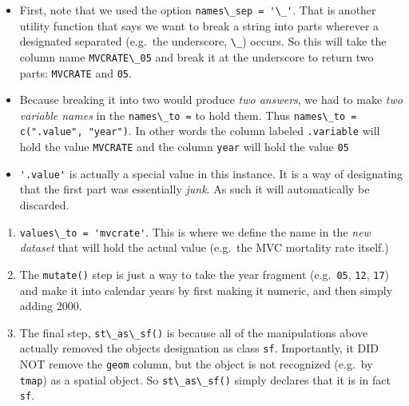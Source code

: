 \documentclass[
]{book}
\newcommand{\passthrough}[1]{#1}
\providecommand{\tightlist}{%
  \setlength{\itemsep}{0pt}\setlength{\parskip}{0pt}}
\begin{document}
\begin{itemize}
\tightlist
\item
  First, note that we used the option \passthrough{\lstinline!names\_sep = '\_'!}. That is another utility function that says we want to break a string into parts wherever a designated separated (e.g.~the underscore, \passthrough{\lstinline!\_!}) occurs. So this will take the column name \passthrough{\lstinline!MVCRATE\_05!} and break it at the underscore to return two parts: \passthrough{\lstinline!MVCRATE!} and \passthrough{\lstinline!05!}.
\item
  Because breaking it into two would produce \emph{two answers}, we had to make \emph{two variable names} in the \passthrough{\lstinline!names\_to =!} to hold them. Thus \passthrough{\lstinline!names\_to = c(".value", "year")!}. In other words the column labeled \passthrough{\lstinline!.variable!} will hold the value \passthrough{\lstinline!MVCRATE!} and the column \passthrough{\lstinline!year!} will hold the value \passthrough{\lstinline!05!}
\item
  \passthrough{\lstinline!'.value'!} is actually a special value in this instance. It is a way of designating that the first part was essentially \emph{junk}. As such it will automatically be discarded.
\end{itemize}

\begin{enumerate}
\def\labelenumi{\arabic{enumi}.}
\setcounter{enumi}{5}
\tightlist
\item
  \passthrough{\lstinline!values\_to = 'mvcrate'!}. This is where we define the name in the \emph{new dataset} that will hold the actual value (e.g.~the MVC mortality rate itself.)
\item
  The \passthrough{\lstinline!mutate()!} step is just a way to take the year fragment (e.g.~\passthrough{\lstinline!05!}, \passthrough{\lstinline!12!}, \passthrough{\lstinline!17!}) and make it into calendar years by first making it numeric, and then simply adding 2000.
\item
  The final step, \passthrough{\lstinline!st\_as\_sf()!} is because all of the manipulations above actually removed the objects designation as class \passthrough{\lstinline!sf!}. Importantly, it DID NOT remove the \passthrough{\lstinline!geom!} column, but the object is not recognized (e.g.~by \passthrough{\lstinline!tmap!}) as a spatial object. So \passthrough{\lstinline!st\_as\_sf()!} simply declares that it is in fact \passthrough{\lstinline!sf!}.
\end{enumerate}
\end{document}
